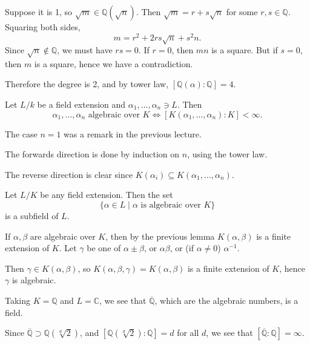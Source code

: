 \documentclass[12pt]{article}
\begin{document}
\begin{exbox}
\begin{enumerate}
		Suppose it is 1, so $\sqrt m \in \mathbb{Q}(\sqrt n)$. Then $\sqrt m = r + s \sqrt n$ for some $r, s \in \mathbb{Q}$. Squaring both sides,
		\[
		m = r^2 + 2rs \sqrt n + s^2 n.
		\]
		Since $\sqrt n \not \in \mathbb{Q}$, we must have $rs = 0$. If $r = 0$, then $mn$ is a square. But if $s = 0$, then $m$ is a square, hence we have a contradiction.

		Therefore the degree is 2, and by tower law, $[\mathbb{Q}(\alpha) : \mathbb{Q}] = 4$.
	\end{enumerate}
\end{exbox}


\begin{lemma}\label{le:alg_iff}
	Let $L/k$ be a field extension and $\alpha_1, \ldots, \alpha_n \ni L$. Then
	\[
		\alpha_1, \ldots, \alpha_n \text{ algebraic over } K \iff [K(\alpha_1, \ldots, \alpha_n) : K] < \infty.
	\]
\end{lemma}

\begin{proofbox}
	The case $n = 1$ was a remark in the previous lecture.

	The forwards direction is done by induction on $n$, using the tower law.

	The reverse direction is clear since $K(\alpha_i) \subseteq K(\alpha_1, \ldots, \alpha_n)$.
\end{proofbox}

\begin{corollary}
	Let $L/K$ be any field extension. Then the set
	\[
		\{\alpha \in L \mid \alpha \text{ is algebraic over } K\}
	\]
	is a subfield of $L$.
\end{corollary}

\begin{proofbox}
	If $\alpha, \beta$ are algebraic over $K$, then by the previous lemma $K(\alpha, \beta)$ is a finite extension of $K$. Let $\gamma$ be one of $\alpha \pm \beta$, or $\alpha \beta$, or (if $\alpha \neq 0$) $\alpha^{-1}$.

	Then $\gamma \in K(\alpha, \beta)$, so $K(\alpha, \beta, \gamma) = K(\alpha, \beta)$ is a finite extension of $K$, hence $\gamma$ is algebraic.
\end{proofbox}

\begin{exbox}
	Taking $K = \mathbb{Q}$ and $L = \mathbb{C}$, we see that $\overline{\mathbb{Q}}$, which are the algebraic numbers, is a field.

	Since $\overline{\mathbb{Q}} \supset \mathbb{Q}(\sqrt[d]2)$, and $[\mathbb{Q}(\sqrt[d]2): \mathbb{Q}]=d$ for all $d$, we see that $[\overline{\mathbb{Q}} : \mathbb{Q}] = \infty$.
\end{exbox}
\end{document}
